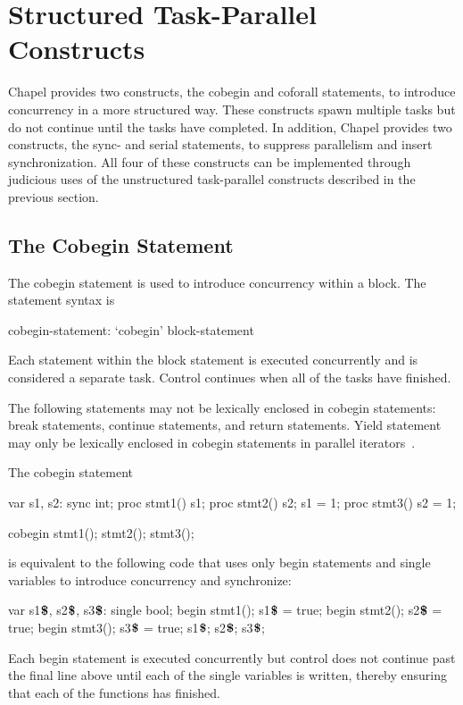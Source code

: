 \section{Structured Task-Parallel Constructs}
\label{structured_task_parallelism}

Chapel provides two constructs, the cobegin and coforall statements,
to introduce concurrency in a more structured way.  These constructs
spawn multiple tasks but do not continue until the tasks have
completed.  In addition, Chapel provides two constructs, the sync- and
serial statements, to suppress parallelism and insert synchronization.
All four of these constructs can be implemented through judicious uses
of the unstructured task-parallel constructs described in the previous
section.

\subsection{The Cobegin Statement}
\label{Cobegin}

The cobegin statement is used to introduce concurrency within a
block.  The  statement syntax is
\begin{syntax}
cobegin-statement:
  `cobegin' block-statement
\end{syntax}
Each statement within the block statement is executed concurrently and
is considered a separate task.  Control continues when all of the
tasks have finished.

The following statements may not be lexically enclosed in
cobegin statements: break statements, continue statements, and
return statements.  Yield statement may only be lexically enclosed in
cobegin statements in parallel iterators~.

\begin{example}
The cobegin statement
\begin{chapelpre}
var s1, s2: sync int;
proc stmt1() { s1; }
proc stmt2() { s2; s1 = 1; }
proc stmt3() { s2 = 1; }
\end{chapelpre}
\begin{chapel}
cobegin {
  stmt1();
  stmt2();
  stmt3();
}
\end{chapel}
is equivalent to the following code that uses only begin statements
and single variables to introduce concurrency and synchronize:
\begin{chapel}
var s1$\mbox{{\bf \$}}$, s2$\mbox{{\bf \$}}$, s3$\mbox{{\bf \$}}$: single bool;
begin { stmt1(); s1$\mbox{{\bf \$}}$ = true; }
begin { stmt2(); s2$\mbox{{\bf \$}}$ = true; }
begin { stmt3(); s3$\mbox{{\bf \$}}$ = true; }
s1$\mbox{{\bf \$}}$; s2$\mbox{{\bf \$}}$; s3$\mbox{{\bf \$}}$;
\end{chapel}
\begin{chapeloutput}
\end{chapeloutput}
Each begin statement is executed concurrently but control does not
continue past the final line above until each of the single variables
is written, thereby ensuring that each of the functions has finished.
\end{example}

